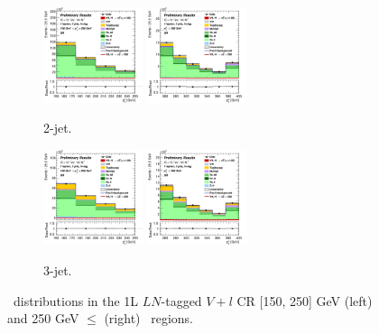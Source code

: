 \begin{figure}[h!]
    \centering
    \begin{subfigure}[b]{\textwidth}
        \centering
        \includegraphics[width=0.32\textwidth]{Images/VH/Own_fit/postfit_VHcc/Region_distpTV_BMax250_BMin150_DSR_J2_TTypeln_T1_L1_Y6051_GlobalFit_conditionnal_mu1.png}
        \includegraphics[width=0.32\textwidth]{Images/VH/Own_fit/postfit_VHcc/Region_distpTV_BMin250_DSR_J2_TTypeln_T1_L1_Y6051_GlobalFit_conditionnal_mu1.png}
        \caption{2-jet.}
        \label{fig:plots_VHcc_1L_LN_2J}
    \end{subfigure}
    \begin{subfigure}[b]{\textwidth}
        \centering
        \includegraphics[width=0.32\textwidth]{Images/VH/Own_fit/postfit_VHcc/Region_distpTV_BMax250_BMin150_DSR_J3_TTypeln_T1_L1_Y6051_GlobalFit_conditionnal_mu1.png}
        \includegraphics[width=0.32\textwidth]{Images/VH/Own_fit/postfit_VHcc/Region_distpTV_BMin250_DSR_J3_TTypeln_T1_L1_Y6051_GlobalFit_conditionnal_mu1.png}
        \caption{3-jet.}
        \label{fig:plots_VHcc_1L_SR_3J}
    \end{subfigure}
    \caption{\ptv\ distributions in the 1L $LN$-tagged $V+l$ CR [150, 250] GeV (left) and 250 GeV $\leq$ (right) \ptv\ regions.}
    \label{fig:plots_VHcc_1L_LN}
\end{figure}

